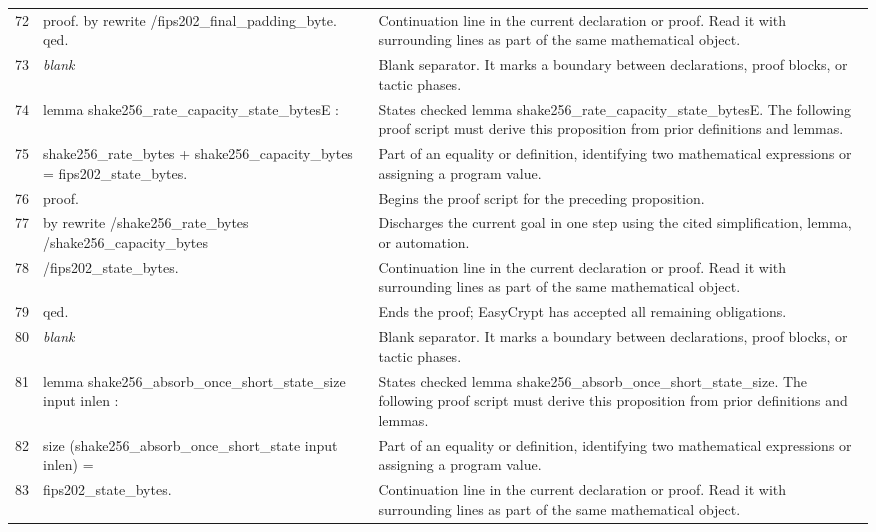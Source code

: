 \documentclass[10pt]{article}
\begin{document}
\begin{longtable}{r L{0.53\textwidth} L{0.37\textwidth}}
72 & {\ttfamily\scriptsize proof. by rewrite /fips202\_final\_padding\_byte. qed.} & Continuation line in the current declaration or proof.  Read it with surrounding lines as part of the same mathematical object. \\
73 & {\ttfamily\scriptsize \emph{blank}} & Blank separator.  It marks a boundary between declarations, proof blocks, or tactic phases. \\
74 & {\ttfamily\scriptsize lemma shake256\_rate\_capacity\_state\_bytesE :} & States checked lemma shake256\_rate\_capacity\_state\_bytesE.  The following proof script must derive this proposition from prior definitions and lemmas. \\
75 & {\ttfamily\scriptsize   shake256\_rate\_bytes + shake256\_capacity\_bytes = fips202\_state\_bytes.} & Part of an equality or definition, identifying two mathematical expressions or assigning a program value. \\
76 & {\ttfamily\scriptsize proof.} & Begins the proof script for the preceding proposition. \\
77 & {\ttfamily\scriptsize by rewrite /shake256\_rate\_bytes /shake256\_capacity\_bytes} & Discharges the current goal in one step using the cited simplification, lemma, or automation. \\
78 & {\ttfamily\scriptsize            /fips202\_state\_bytes.} & Continuation line in the current declaration or proof.  Read it with surrounding lines as part of the same mathematical object. \\
79 & {\ttfamily\scriptsize qed.} & Ends the proof; EasyCrypt has accepted all remaining obligations. \\
80 & {\ttfamily\scriptsize \emph{blank}} & Blank separator.  It marks a boundary between declarations, proof blocks, or tactic phases. \\
81 & {\ttfamily\scriptsize lemma shake256\_absorb\_once\_short\_state\_size input inlen :} & States checked lemma shake256\_absorb\_once\_short\_state\_size.  The following proof script must derive this proposition from prior definitions and lemmas. \\
82 & {\ttfamily\scriptsize   size (shake256\_absorb\_once\_short\_state input inlen) =} & Part of an equality or definition, identifying two mathematical expressions or assigning a program value. \\
83 & {\ttfamily\scriptsize   fips202\_state\_bytes.} & Continuation line in the current declaration or proof.  Read it with surrounding lines as part of the same mathematical object. \\

\end{longtable}
\end{document}

